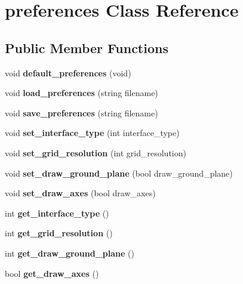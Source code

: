 \hypertarget{classpreferences}{}\section{preferences Class Reference}
\label{classpreferences}
\subsection*{Public Member Functions}
\begin{DoxyCompactItemize}
\item 
\mbox{\label{classpreferences_a35f7b6a82f35749a7d0d4a42073cdcf4}} 
void {\bfseries default\+\_\+preferences} (void)
\item 
\mbox{\label{classpreferences_a679949faa2166d83d002d234f6394b9f}} 
void {\bfseries load\+\_\+preferences} (string filename)
\item 
\mbox{\label{classpreferences_ab02600d9ef05e3cfb6263e3fe4dce85c}} 
void {\bfseries save\+\_\+preferences} (string filename)
\item 
\mbox{\label{classpreferences_a6fbbdf1ac3a3b0b154d693c328b0f025}} 
void {\bfseries set\+\_\+interface\+\_\+type} (int interface\+\_\+type)
\item 
\mbox{\label{classpreferences_a6dfb48f950f7ca18b5aadc0c45f5872f}} 
void {\bfseries set\+\_\+grid\+\_\+resolution} (int grid\+\_\+resolution)
\item 
\mbox{\label{classpreferences_ab525e5b6273a19190fec0c2bd6c0605a}} 
void {\bfseries set\+\_\+draw\+\_\+ground\+\_\+plane} (bool draw\+\_\+ground\+\_\+plane)
\item 
\mbox{\label{classpreferences_afbdc7487245f6e1c2f26c3ef7ba986fa}} 
void {\bfseries set\+\_\+draw\+\_\+axes} (bool draw\+\_\+axes)
\item 
\mbox{\label{classpreferences_a0d2136cfbbad55bfaf64eae9549bd68e}} 
int {\bfseries get\+\_\+interface\+\_\+type} ()
\item 
\mbox{\label{classpreferences_a9cd938457a3d4387017fcbd6f6a489b1}} 
int {\bfseries get\+\_\+grid\+\_\+resolution} ()
\item 
\mbox{\label{classpreferences_a790b34241f358007907fa3fda6978add}} 
int {\bfseries get\+\_\+draw\+\_\+ground\+\_\+plane} ()
\item 
\mbox{\label{classpreferences_ad1eec1245431960040efa6c31cc7c57b}} 
bool {\bfseries get\+\_\+draw\+\_\+axes} ()
\end{DoxyCompactItemize}
